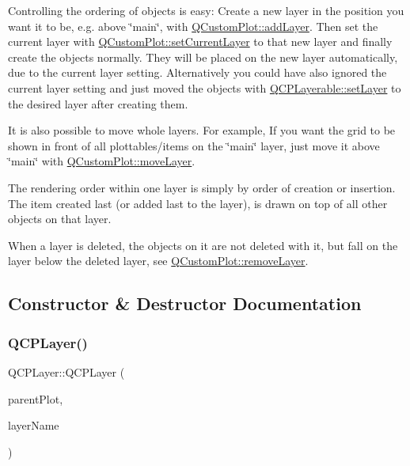 Controlling the ordering of objects is easy\+: Create a new layer in the position you want it to be, e.\+g. above \char`\"{}main\char`\"{}, with \mbox{\hyperlink{class_q_custom_plot_ad5255393df078448bb6ac83fa5db5f52}{Q\+Custom\+Plot\+::add\+Layer}}. Then set the current layer with \mbox{\hyperlink{class_q_custom_plot_a73a6dc47c653bb6f8f030abca5a11852}{Q\+Custom\+Plot\+::set\+Current\+Layer}} to that new layer and finally create the objects normally. They will be placed on the new layer automatically, due to the current layer setting. Alternatively you could have also ignored the current layer setting and just moved the objects with \mbox{\hyperlink{class_q_c_p_layerable_ab0d0da6d2de45a118886d2c8e16d5a54}{Q\+C\+P\+Layerable\+::set\+Layer}} to the desired layer after creating them.

It is also possible to move whole layers. For example, If you want the grid to be shown in front of all plottables/items on the \char`\"{}main\char`\"{} layer, just move it above \char`\"{}main\char`\"{} with \mbox{\hyperlink{class_q_custom_plot_ae896140beff19424e9e9e02d6e331104}{Q\+Custom\+Plot\+::move\+Layer}}.

The rendering order within one layer is simply by order of creation or insertion. The item created last (or added last to the layer), is drawn on top of all other objects on that layer.

When a layer is deleted, the objects on it are not deleted with it, but fall on the layer below the deleted layer, see \mbox{\hyperlink{class_q_custom_plot_a40f75e342c5eaab6a86066a42a0e2a94}{Q\+Custom\+Plot\+::remove\+Layer}}. 

\subsection{Constructor \& Destructor Documentation}
\mbox{\label{class_q_c_p_layer_a5d0657fc86d624e5efbe930ef21af718}} 
\subsubsection{\texorpdfstring{Q\+C\+P\+Layer()}{QCPLayer()}}
{\footnotesize\ttfamily Q\+C\+P\+Layer\+::\+Q\+C\+P\+Layer (\begin{DoxyParamCaption}\item[{\mbox{\hyperlink{class_q_custom_plot}{Q\+Custom\+Plot}} $\ast$}]{parent\+Plot,  }\item[{const Q\+String \&}]{layer\+Name }\end{DoxyParamCaption})}

